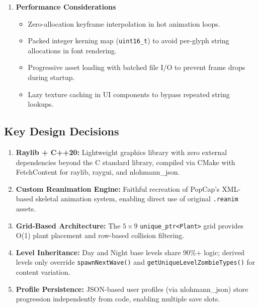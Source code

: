 \documentclass[12pt,a4paper]{article}
\begin{document}
\begin{enumerate}[leftmargin=2em]
\begin{itemize}
        \item Day levels (Level2, Level3) and night levels (Level5, Level6) inherit from their respective bases with minimal overrides.
        \item The Reanimation engine supports any PopCap \texttt{.reanim} file without code changes.
    \end{itemize}
    \item \textbf{Performance Considerations}
    \begin{itemize}
        \item Zero-allocation keyframe interpolation in hot animation loops.
        \item Packed integer kerning map (\texttt{uint16\_t}) to avoid per-glyph string allocations in font rendering.
        \item Progressive asset loading with batched file I/O to prevent frame drops during startup.
        \item Lazy texture caching in UI components to bypass repeated string lookups.
    \end{itemize}
\end{enumerate}
\subsection{Key Design Decisions}
\begin{enumerate}[leftmargin=2em]
    \item \textbf{Raylib + C++20:} Lightweight graphics library with zero external dependencies beyond the C standard library, compiled via CMake with FetchContent for raylib, raygui, and nlohmann\_json.
    \item \textbf{Custom Reanimation Engine:} Faithful recreation of PopCap's XML-based skeletal animation system, enabling direct use of original \texttt{.reanim} assets.
    \item \textbf{Grid-Based Architecture:} The $5 \times 9$ \texttt{unique\_ptr<Plant>} grid provides O{(1)} plant placement and row-based collision filtering.
    \item \textbf{Level Inheritance:} Day and Night base levels share 90\%+ logic; derived levels only override \texttt{spawnNextWave}\texttt{()} and \texttt{getUniqueLevelZombieTypes}\texttt{()} for content variation.
    \item \textbf{Profile Persistence:} JSON-based user profiles (via nlohmann\_json) store progression independently from code, enabling multiple save slots.
\end{enumerate}
\end{document}
